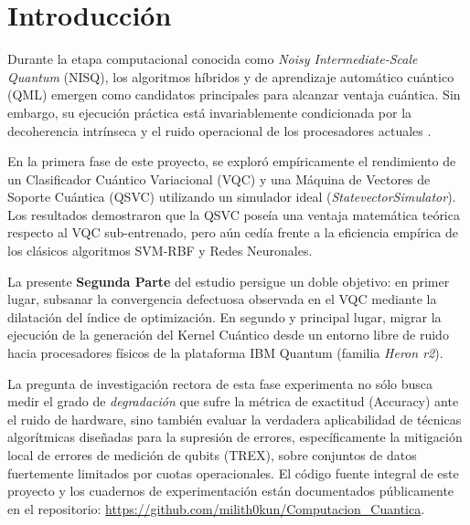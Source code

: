 \section{Introducci\'on}
\label{sec:introduccion}

Durante la etapa computacional conocida como \textit{Noisy Intermediate-Scale Quantum} (NISQ), los algoritmos h\'ibridos y de aprendizaje autom\'atico cu\'antico (QML) emergen como candidatos principales para alcanzar ventaja cu\'antica. Sin embargo, su ejecuci\'on pr\'actica est\'a invariablemente condicionada por la decoherencia intr\'inseca y el ruido operacional de los procesadores actuales \citep{preskill2018quantum}.

En la primera fase de este proyecto, se explor\'o emp\'iricamente el rendimiento de un Clasificador Cu\'antico Variacional (VQC) \citep{cerezo2021} y una M\'aquina de Vectores de Soporte Cu\'antica (QSVC) \citep{havlicek2019} utilizando un simulador ideal (\textit{StatevectorSimulator}). Los resultados demostraron que la QSVC pose\'ia una ventaja matem\'atica te\'orica respecto al VQC sub-entrenado, pero a\'un ced\'ia frente a la eficiencia emp\'irica de los cl\'asicos algoritmos SVM-RBF y Redes Neuronales.

La presente \textbf{Segunda Parte} del estudio persigue un doble objetivo: en primer lugar, subsanar la convergencia defectuosa observada en el VQC mediante la dilataci\'on del \'indice de optimizaci\'on. En segundo y principal lugar, migrar la ejecuci\'on de la generaci\'on del Kernel Cu\'antico desde un entorno libre de ruido hacia procesadores f\'isicos de la plataforma IBM Quantum (familia \textit{Heron r2}).

La pregunta de investigaci\'on rectora de esta fase experimenta no s\'olo busca medir el grado de \textit{degradaci\'on} que sufre la m\'etrica de exactitud (Accuracy) ante el ruido de hardware, sino tambi\'en evaluar la verdadera aplicabilidad de t\'ecnicas algor\'itmicas dise\~nadas para la supresi\'on de errores, espec\'ificamente la mitigaci\'on local de errores de medici\'on de qubits (TREX), sobre conjuntos de datos fuertemente limitados por cuotas operacionales. El c\'odigo fuente integral de este proyecto y los cuadernos de experimentaci\'on est\'an documentados p\'ublicamente en el repositorio: \url{https://github.com/milith0kun/Computacion_Cuantica}.
